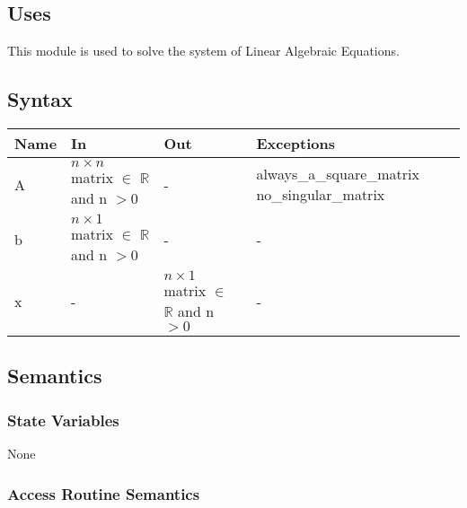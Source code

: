 \documentclass[12pt, titlepage]{article}
\begin{document}
\subsection{Uses}
This module is used to solve the system of Linear Algebraic Equations.


\subsection{Syntax}

\begin{center}
\begin{tabular}{p{2cm} p{4cm} p{4cm} p{2cm}}
\hline
\textbf{Name} & \textbf{In} & \textbf{Out} & \textbf{Exceptions} \\
\hline

A & $n \times n$ matrix $\in$ $\mathbb{R}$ and n $> 0$ & - &  always\_a\_square\_matrix no\_singular\_matrix \\
b & $n \times 1$ matrix $\in$ $\mathbb{R}$ and n $> 0$ & - & - \\
x & - & $n \times 1$ matrix $\in$ $\mathbb{R}$ and n $> 0$ & - \\
\hline
\end{tabular}
\end{center}

\subsection{Semantics}

\subsubsection{State Variables}

None

\subsubsection{Access Routine Semantics}
\end{document}
